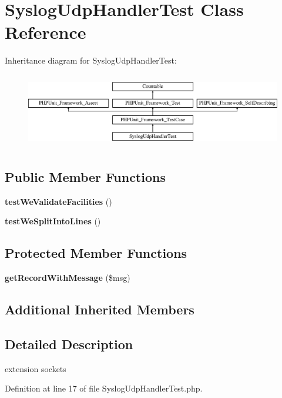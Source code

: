 \section{Syslog\+Udp\+Handler\+Test Class Reference}
\label{class_monolog_1_1_handler_1_1_syslog_udp_handler_test}
Inheritance diagram for Syslog\+Udp\+Handler\+Test\+:\begin{figure}[H]
\begin{center}
\leavevmode
\includegraphics[height=3.303835cm]{class_monolog_1_1_handler_1_1_syslog_udp_handler_test}
\end{center}
\end{figure}
\subsection*{Public Member Functions}
\begin{DoxyCompactItemize}
\item 
{\bf test\+We\+Validate\+Facilities} ()
\item 
{\bf test\+We\+Split\+Into\+Lines} ()
\end{DoxyCompactItemize}
\subsection*{Protected Member Functions}
\begin{DoxyCompactItemize}
\item 
{\bf get\+Record\+With\+Message} (\$msg)
\end{DoxyCompactItemize}
\subsection*{Additional Inherited Members}


\subsection{Detailed Description}
extension sockets 

Definition at line 17 of file Syslog\+Udp\+Handler\+Test.\+php.



